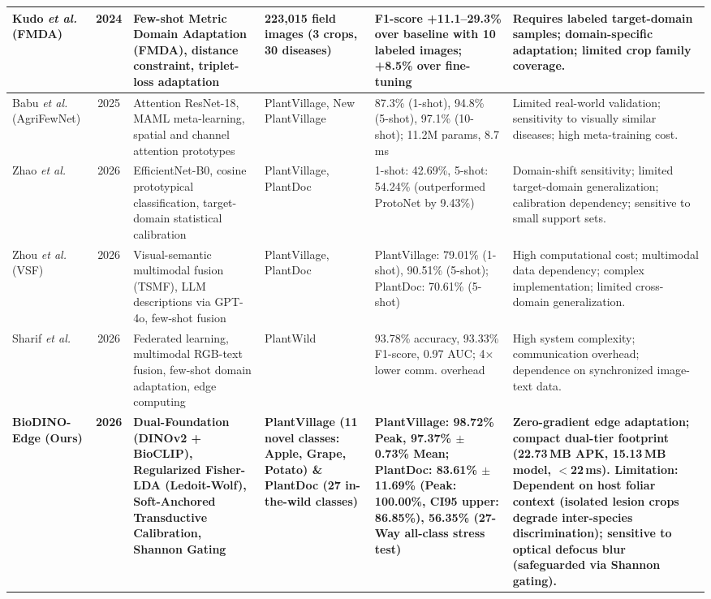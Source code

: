 \documentclass[conference]{IEEEtran}
\begin{document}
\begin{table}[t]
{\begin{tabular}{p{2.8cm}cp{4.5cm}p{3.2cm}p{4.2cm}p{4.8cm}}
\midrule
Kudo \textit{et al.} (FMDA) \cite{kudo2025few} & 2024 & Few-shot Metric Domain Adaptation (FMDA), distance constraint, triplet-loss adaptation & 223,015 field images (3 crops, 30 diseases) & F1-score +11.1--29.3\% over baseline with 10 labeled images; +8.5\% over fine-tuning & Requires labeled target-domain samples; domain-specific adaptation; limited crop family coverage. \\
\midrule
Babu \textit{et al.} (AgriFewNet) \cite{babu2025agrifewnet} & 2025 & Attention ResNet-18, MAML meta-learning, spatial and channel attention prototypes & PlantVillage, New PlantVillage & 87.3\% (1-shot), 94.8\% (5-shot), 97.1\% (10-shot); 11.2M params, 8.7\,ms & Limited real-world validation; sensitivity to visually similar diseases; high meta-training cost. \\
\midrule
Zhao \textit{et al.} \cite{zhao2026lightweight} & 2026 & EfficientNet-B0, cosine prototypical classification, target-domain statistical calibration & PlantVillage, PlantDoc & 1-shot: 42.69\%, 5-shot: 54.24\% (outperformed ProtoNet by 9.43\%) & Domain-shift sensitivity; limited target-domain generalization; calibration dependency; sensitive to small support sets. \\
\midrule
Zhou \textit{et al.} (VSF) \cite{zhou2026vsf} & 2026 & Visual-semantic multimodal fusion (TSMF), LLM descriptions via GPT-4o, few-shot fusion & PlantVillage, PlantDoc & PlantVillage: 79.01\% (1-shot), 90.51\% (5-shot); PlantDoc: 70.61\% (5-shot) & High computational cost; multimodal data dependency; complex implementation; limited cross-domain generalization. \\
\midrule
Sharif \textit{et al.} \cite{sharif2026real} & 2026 & Federated learning, multimodal RGB-text fusion, few-shot domain adaptation, edge computing & PlantWild & 93.78\% accuracy, 93.33\% F1-score, 0.97 AUC; 4$\times$ lower comm. overhead & High system complexity; communication overhead; dependence on synchronized image-text data. \\
\midrule
\textbf{BioDINO-Edge (Ours)} & \textbf{2026} & \textbf{Dual-Foundation (DINOv2 + BioCLIP), Regularized Fisher-LDA (Ledoit-Wolf), Soft-Anchored Transductive Calibration, Shannon Gating} & \textbf{PlantVillage (11 novel classes: Apple, Grape, Potato) \& PlantDoc (27 in-the-wild classes)} & \textbf{PlantVillage: 98.72\% Peak, 97.37\% $\pm$ 0.73\% Mean; PlantDoc: 83.61\% $\pm$ 11.69\% (Peak: 100.00\%, CI95 upper: 86.85\%), 56.35\% (27-Way all-class stress test)} & \textbf{Zero-gradient edge adaptation; compact dual-tier footprint (22.73\,MB APK, 15.13\,MB model, $<$22\,ms). Limitation: Dependent on host foliar context (isolated lesion crops degrade inter-species discrimination); sensitive to optical defocus blur (safeguarded via Shannon gating).} \\
\bottomrule
\end{tabular}%
}
\end{table}
\end{document}
